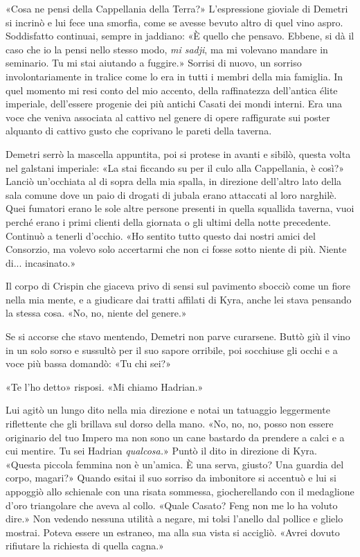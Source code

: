 «Cosa ne pensi della Cappellania della Terra?» L'espressione gioviale di
Demetri si incrinò e lui fece una smorfia, come se avesse bevuto altro
di quel vino aspro. Soddisfatto continuai, sempre in jaddiano: «È quello
che pensavo. Ebbene, si dà il caso che io la pensi nello stesso modo,
\emph{mi sadji}, ma mi volevano mandare in seminario. Tu mi stai
aiutando a fuggire.» Sorrisi di nuovo, un sorriso involontariamente in
tralice come lo era in tutti i membri della mia famiglia. In quel
momento mi resi conto del mio accento, della raffinatezza dell'antica
élite imperiale, dell'essere progenie dei più antichi Casati dei mondi
interni. Era una voce che veniva associata al cattivo nel genere di
opere raffigurate sui poster alquanto di cattivo gusto che coprivano le
pareti della taverna.

Demetri serrò la mascella appuntita, poi si protese in avanti e sibilò,
questa volta nel galstani imperiale: «La stai ficcando su per il culo
alla Cappellania, è così?» Lanciò un'occhiata al di sopra della mia
spalla, in direzione dell'altro lato della sala comune dove un paio di
drogati di jubala erano attaccati al loro narghilè. Quei fumatori erano
le sole altre persone presenti in quella squallida taverna, vuoi perché
erano i primi clienti della giornata o gli ultimi della notte
precedente. Continuò a tenerli d'occhio. «Ho sentito tutto questo dai
nostri amici del Consorzio, ma volevo solo accertarmi che non ci fosse
sotto niente di più. Niente di... incasinato.»

Il corpo di Crispin che giaceva privo di sensi sul pavimento sbocciò
come un fiore nella mia mente, e a giudicare dai tratti affilati di
Kyra, anche lei stava pensando la stessa cosa. «No, no, niente del
genere.»

Se si accorse che stavo mentendo, Demetri non parve curarsene. Buttò giù
il vino in un solo sorso e sussultò per il suo sapore orribile, poi
socchiuse gli occhi e a voce più bassa domandò: «Tu chi sei?»

«Te l'ho detto» risposi. «Mi chiamo Hadrian.»

Lui agitò un lungo dito nella mia direzione e notai un tatuaggio
leggermente riflettente che gli brillava sul dorso della mano. «No, no,
no, posso non essere originario del tuo Impero ma non sono un cane
bastardo da prendere a calci e a cui mentire. Tu sei Hadrian
\emph{qualcosa.}» Puntò il dito in direzione di Kyra. «Questa piccola
femmina non è un'amica. È una serva, giusto? Una guardia del corpo,
magari?» Quando esitai il suo sorriso da imbonitore si accentuò e lui si
appoggiò allo schienale con una risata sommessa, giocherellando con il
medaglione d'oro triangolare che aveva al collo. «Quale Casato? Feng non
me lo ha voluto dire.» Non vedendo nessuna utilità a negare, mi tolsi
l'anello dal pollice e glielo mostrai. Poteva essere un estraneo, ma
alla sua vista si accigliò. «Avrei dovuto rifiutare la richiesta di
quella cagna.»

